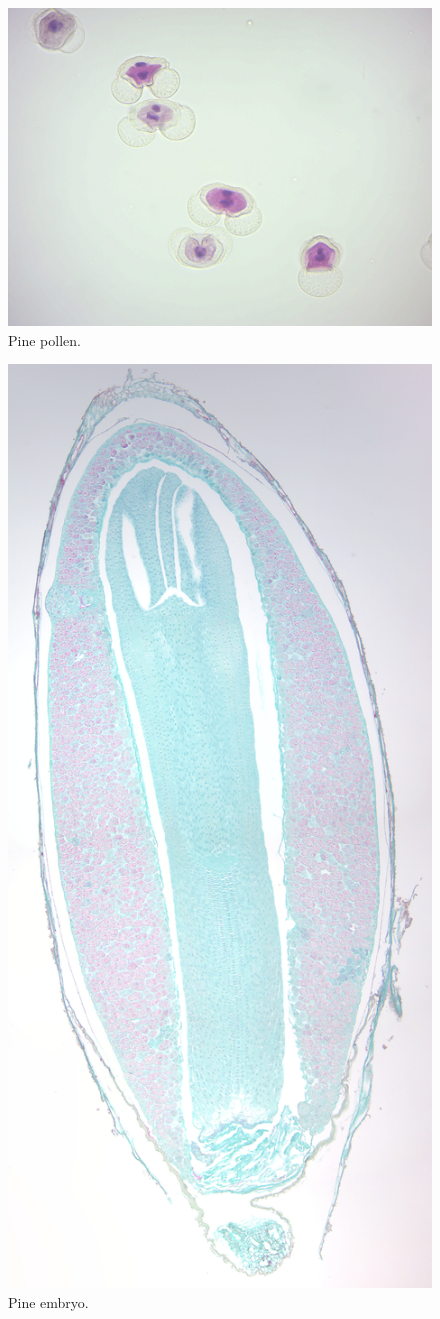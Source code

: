 \begin{figure}

{\centering \includegraphics[width=0.7\linewidth]{./figures/gymnosperms/pine_pollen}

}

\caption{Pine pollen.}\label{fig:pollen}
\end{figure}



\begin{figure}

{\centering \includegraphics[width=0.7\linewidth]{./figures/gymnosperms/pine_embryo}

}

\caption{Pine embryo.}\label{fig:pembryo}
\end{figure}



